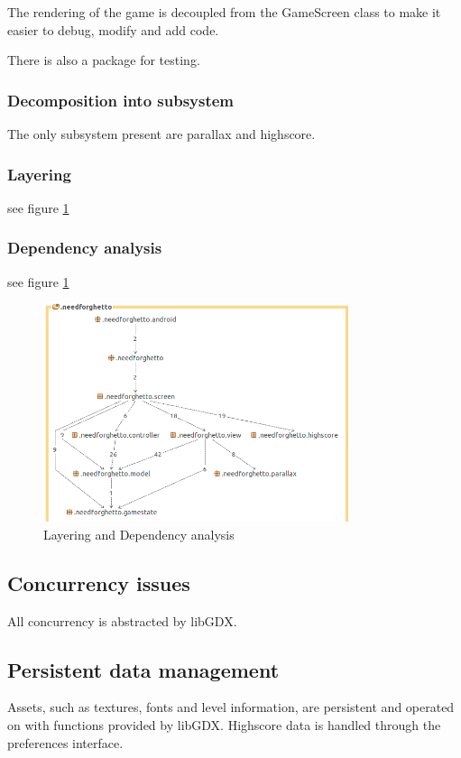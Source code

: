 \documentclass{article}
\begin{document}
The rendering of the game is decoupled from the GameScreen class to make it easier to debug, modify and add code.

There is also a package for testing.

\subsubsection{Decomposition into subsystem}
The only subsystem present are parallax and highscore.

\subsubsection{Layering}
see figure \ref{fig:stan}

\subsubsection{Dependency analysis}
see figure \ref{fig:stan}


\begin{figure}[h]
  \centering
  \includegraphics[width=0.8\textwidth]{stan.png}
  \caption{Layering and Dependency analysis}
  \label{fig:stan}
\end{figure}

\subsection{Concurrency issues}
All concurrency is abstracted by libGDX.

\subsection{Persistent data management}
Assets, such as textures, fonts and level information, are persistent and operated on with functions provided by libGDX. Highscore data is handled through the preferences interface. 
\end{document}
